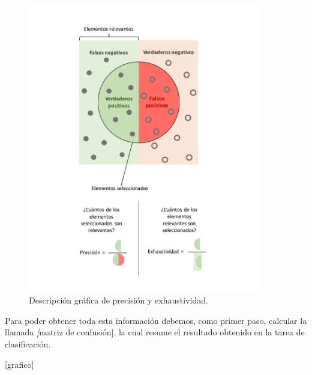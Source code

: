 \begin{figure}[H]
  \centering
    \includegraphics[width=0.9\textwidth]{Figuras/Precision}
      \caption{Descripción gráfica de precisión y exhaustividad.}
    \label{fig:precision}
\end{figure}



Para poder obtener toda esta información debemos, como primer paso, calcular la llamada \textit[matriz de confusión], la cual resume el resultado obtenido en la tarea de clasificación.

[grafico] 

